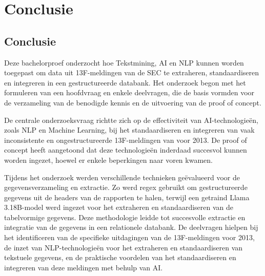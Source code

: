 
\chapter{Conclusie}%
\label{ch:conclusie}






\section{Conclusie}
Deze bachelorproef onderzocht hoe Tekstmining, AI en NLP kunnen worden toegepast om data uit 13F-meldingen van de SEC te extraheren, standaardiseren en integreren in een gestructureerde databank. Het onderzoek begon met het formuleren van een hoofdvraag en enkele deelvragen, die de basis vormden voor de verzameling van de benodigde kennis en de uitvoering van de proof of concept.

De centrale onderzoeksvraag richtte zich op de effectiviteit van AI-technologieën, zoals NLP en Machine Learning, bij het standaardiseren en integreren van vaak inconsistente en ongestructureerde 13F-meldingen van voor 2013. De proof of concept heeft aangetoond dat deze technologieën inderdaad succesvol kunnen worden ingezet, hoewel er enkele beperkingen naar voren kwamen.

Tijdens het onderzoek werden verschillende technieken geëvalueerd voor de gegevensverzameling en extractie. Zo werd regex gebruikt om gestructureerde gegevens uit de headers van de rapporten te halen, terwijl een getraind Llama 3.18B-model werd ingezet voor het extraheren en standaardiseren van de tabelvormige gegevens. Deze methodologie leidde tot succesvolle extractie en integratie van de gegevens in een relationele databank. De deelvragen hielpen bij het identificeren van de specifieke uitdagingen van de 13F-meldingen voor 2013, de inzet van NLP-technologieën voor het extraheren en standaardiseren van tekstuele gegevens, en de praktische voordelen van het standaardiseren en integreren van deze meldingen met behulp van AI.

